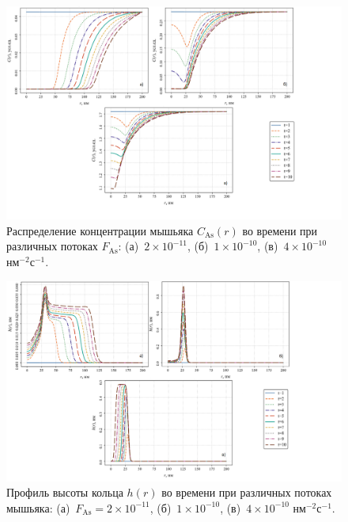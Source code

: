 \documentclass[14pt,oneside]{extarticle}
\begin{document}
\begin{figure}
    \begin{center}
    \includegraphics[width=18cm]{images/C_As_t_2.png}
    \caption{\label{fig:as_flux_2} Распределение концентрации мышьяка $C_{\text{As}}(r)$ во времени при различных потоках $F_{\text{As}}$: (а)~$2 \times 10^{-11}$, (б)~$1 \times 10^{-10}$, (в)~$4 \times 10^{-10}$ нм$^{-2}$с$^{-1}$.}
    \end{center}
\end{figure}

\begin{figure}
    \begin{center}
    \includegraphics[width=18cm]{images/h_t_2.png}
    \caption{\label{fig:h_flux_2} Профиль высоты кольца $h(r)$ во времени при различных потоках мышьяка: (а)~$F_{\text{As}} = 2 \times 10^{-11}$, (б)~$1 \times 10^{-10}$, (в)~$4 \times 10^{-10}$ нм$^{-2}$с$^{-1}$.}
    \end{center}
\end{figure}
\end{document}
